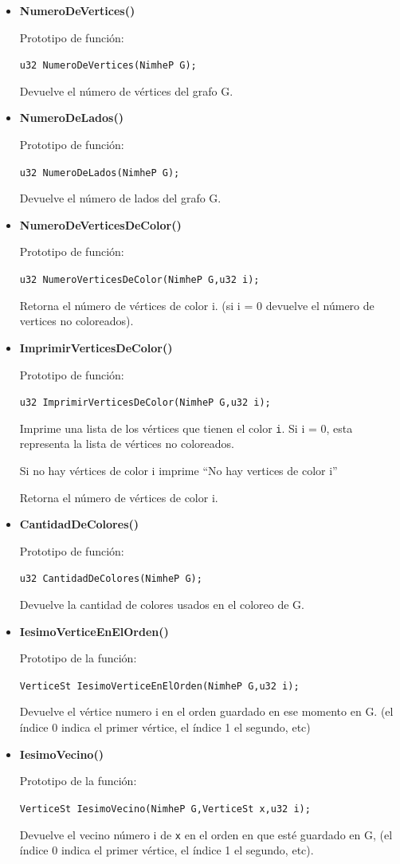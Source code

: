 \documentclass[11pt,a4paper]{article}
\theoremstyle{plain}
\begin{document}
\begin{itemize}
\item{\textbf{{NumeroDeVertices()}}}

Prototipo de función:

\texttt{u32 NumeroDeVertices(NimheP G);}

Devuelve el número de vértices del grafo G.

\item{\textbf{{NumeroDeLados()}}}

Prototipo de función:

\texttt{u32 NumeroDeLados(NimheP G);}

Devuelve el número de lados del grafo G.

\item{\textbf{{NumeroDeVerticesDeColor()}}}

Prototipo de función:

\texttt{u32 NumeroVerticesDeColor(NimheP G,u32 i);}

Retorna el número de vértices de color i. (si i = 0 devuelve el número de vertices no coloreados).

\item\textbf{ImprimirVerticesDeColor()}

Prototipo de función:

\texttt{u32 ImprimirVerticesDeColor(NimheP G,u32 i);}

Imprime una lista de los vértices que tienen el color \texttt{i}. Si i = 0, esta representa la lista de vértices no coloreados.

Si no hay vértices de color i imprime “No hay vertices de color i”

Retorna el número de vértices de color i.

\item\textbf{CantidadDeColores()}

Prototipo de función:

\texttt{u32 CantidadDeColores(NimheP G);}

Devuelve la cantidad de colores usados en el coloreo de G.

\item\textbf{IesimoVerticeEnElOrden()}

Prototipo de la función:

\texttt{VerticeSt IesimoVerticeEnElOrden(NimheP G,u32 i);}

 Devuelve el vértice numero i en el orden guardado en ese momento en G. (el índice 0 indica el primer vértice, el índice 1 el segundo, etc)

\item\textbf{IesimoVecino()}

Prototipo de la función:

\texttt{VerticeSt IesimoVecino(NimheP G,VerticeSt x,u32 i);}

Devuelve el vecino número i de \texttt{x} en el orden en que esté guardado en G, (el índice 0 indica el primer vértice, el índice 1 el segundo, etc).

\end{itemize}
\end{document}
